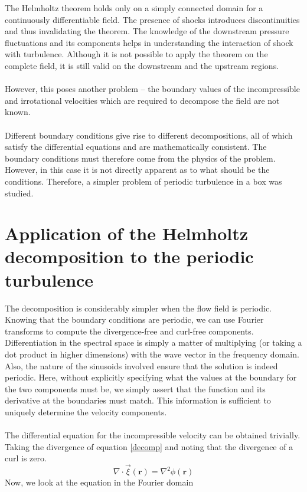 \documentclass[12pt, a4paper]{report}
\begin{document}
The Helmholtz theorem holds only on a simply connected domain for a continuously differentiable field. The presence of shocks introduces discontinuities and thus invalidating the theorem. The knowledge of the downstream pressure fluctuations and its components helps in understanding the interaction of shock with turbulence. Although it is not possible to apply the theorem on the complete field, it is still valid on the downstream and the upstream regions.\\~\\
However, this poses another problem -- the boundary values of the incompressible and irrotational velocities which are required to decompose the field are not known.\\~\\
Different boundary conditions give rise to different decompositions, all of which satisfy the differential equations and are mathematically consistent. The boundary conditions must therefore come from the physics of the problem. However, in this case it is not directly apparent as to what should be the conditions. Therefore, a simpler problem of periodic turbulence in a box was studied.


\chapter{Application of the Helmholtz decomposition to the periodic turbulence}

The decomposition is considerably simpler when the flow field is periodic. Knowing that the boundary conditions are periodic, we can use Fourier transforms to compute the divergence-free and curl-free components. Differentiation in the spectral space is simply a matter of multiplying (or taking a dot product in higher dimensions) with the wave vector in the frequency domain. Also, the nature of the sinusoids involved ensure that the solution is indeed periodic. Here, without explicitly specifying what the values at the boundary for the two components must be, we simply assert that the function and its derivative at the boundaries must match. This information is sufficient to uniquely determine the velocity components. \\~\\

The differential equation for the incompressible velocity can be obtained trivially. Taking the divergence of equation \ref{decomp} and noting that the divergence of a curl is zero.
\begin{equation}\label{incomp_vel}
    \nabla\cdot\vec\xi(\mathbf{r}) = \nabla^2\phi(\mathbf{r})
\end{equation}
Now, we look at the equation in the Fourier domain
\end{document}
